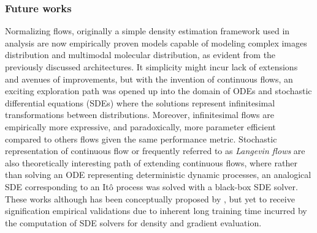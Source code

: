 \subsubsection{Future works} Normalizing flows, originally a simple density
estimation framework used in analysis are now empirically proven models capable
of modeling complex images distribution \citep{kingmaGlowGenerativeFlow2018} and
multimodal molecular distribution, as evident from the previously discussed
architectures. It simplicity might incur lack of extensions and avenues of
improvements, but with the invention of continuous flows, an exciting
exploration path was opened up into the domain of ODEs and stochastic
differential equations (SDEs) where the solutions represent infinitesimal
transformations between distributions. Moreover, infinitesimal flows are
empirically more expressive, and paradoxically, more parameter efficient
compared to others flows \citep{grathwohlFFJORDFreeformContinuous2018} given the
same performance metric. Stochastic representation of continuous flow or
frequently referred to as \textit{Langevin flows} are also theoretically
interesting path of extending continuous flows, where rather than solving an ODE
representing deterministic dynamic processes, an analogical SDE corresponding to
an Itô process was solved with a black-box SDE solver. These works although has
been conceptually proposed by \citep{liScalableGradientsStochastic2020,
liutkusSlicedWassersteinFlowsNonparametric2019,
tzenNeuralStochasticDifferential2019, chenContinuousTimeFlowsEfficient2018}, but
yet to receive signification empirical validations due to inherent long training
time incurred by the computation of SDE solvers for density and gradient
evaluation.

